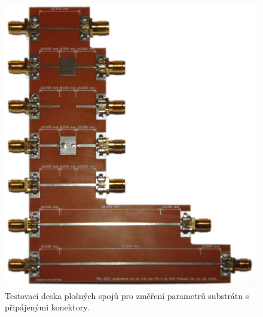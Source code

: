 \begin{figure}[htbp]
\includegraphics[width=\textwidth,keepaspectratio]{images/measurements/uoml.jpg}\caption{Testovací deska plošných spojů pro změření parametrů substrátu s připájenými konektory.}\label{uoml}
\end{figure}